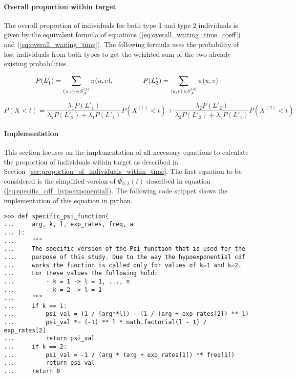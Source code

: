 \paragraph{Overall proportion within target}

The overall proportion of individuals for both type 1 and type 2 individuals
is given by the equivalent formula of equations
(\ref{eq:overall_waiting_time_coeff}) and (\ref{eq:overall_waiting_time}).
The following formula uses the probability of lost individuals from both types
to get the weighted sum of the two already existing probabilities.

\begin{equation*}
    P(L'_1) = \sum_{(u,v) \, \in S_A^{(1)}} \pi(u,v), \hspace{1.5cm}
    P(L'_2) = \sum_{(u,v) \, \in S_A^{(2)}} \pi(u,v)
\end{equation*}

\small
\begin{equation}\label{eq:overall_proportion_within_target}
    P(X < t)= \frac{\lambda_1 P(L'_1)}{\lambda_2 P(L'_2)+\lambda_1 P(L'_1)}
    P(X^{(1)} < t) + \frac{\lambda_2 P(L'_2)}{\lambda_2 P(L'_2) + \lambda_1
    P(L'_1)} P(X^{(2)} < t)
\end{equation}
\normalsize

\paragraph{Implementation}\label{sec:implementation_proportion_individuals}

This section focuses on the implementation of all necessary equations to 
calculate the proportion of individuals within target as described
in Section~\ref{sec:proportion_of_individuals_within_time}.
The first equation to be considered is the simplified version of
\(\Psi_{k, \lambda}(t)\) described in equation
(\ref{eq:specific_cdf_hypoexponential}).
The following code snippet shows the implementation of this equation in python.

\begin{lstlisting}[style=pystyle]
>>> def specific_psi_function(
...     arg, k, l, exp_rates, freq, a
... ):
...     """
...     The specific version of the Psi function that is used for the
...     purpose of this study. Due to the way the hypoexponential cdf
...     works the function is called only for values of k=1 and k=2. 
...     For these values the following hold:
...         - k = 1 -> l = 1, ..., n
...         - k = 2 -> l = 1
...     """
...     if k == 1:
...         psi_val = (1 / (arg**l)) - (1 / (arg + exp_rates[2]) ** l)
...         psi_val *= (-1) ** l * math.factorial(l - 1) / exp_rates[2]
...         return psi_val
...     if k == 2:
...         psi_val = -1 / (arg * (arg + exp_rates[1]) ** freq[1])
...         return psi_val
...     return 0

\end{lstlisting}

